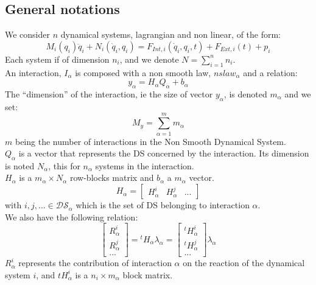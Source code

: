 \documentclass[10pt]{report}
\begin{document}
\subsection{General notations}
We consider $n$ dynamical systems, lagrangian and non linear, of the form: 
\begin{equation}
M_i(q_i) \ddot q_i + N_i(\dot q_i, q_i) = F_{Int,i}(\dot q_i , q_i , t)+F_{Ext,i}(t) + p_i
\end{equation}
Each system if of dimension $n_i$, and we denote $N = \displaystyle{\sum_{i=1}^{n} n_i}$. \\
An interaction, $I_{\alpha}$ is composed with a non smooth law, $nslaw_{\alpha}$ and a relation:
\begin{equation}
y_{\alpha} = H_{\alpha}Q_{\alpha} + b_{\alpha}
\end{equation}
The ``dimension'' of the interaction, ie the size of vector $y_{\alpha}$, is denoted $m_{\alpha}$ and we set: 
$$ M_y = \sum_{\alpha=1}^{m} m_{\alpha}$$
$m$ being the number of interactions in the Non Smooth Dynamical System.  \\
$Q_{\alpha}$ is a vector that represents the DS concerned by the interaction. Its dimension is noted $N_{\alpha}$, this for $n_{\alpha}$ systems in the interaction. \\
$H_{\alpha}$ is a $m_{\alpha} \times N_{\alpha}$ row-blocks matrix and $b_{\alpha}$ a $m_{\alpha}$ vector. \\
\begin{equation}
H_{\alpha}=\left[\begin{array}{ccc} 
H_{\alpha}^i & H_{\alpha}^j & ...\end{array}\right]
\end{equation}
with $i,j,...\in \mathcal{DS}_{\alpha}$ which is the set of DS belonging to interaction $\alpha$.\\
We also have the following relation: 
\begin{equation}
\left[\begin{array}{c} 
R_{\alpha}^i \\
R_{\alpha}^j \\
...  
\end{array}\right] = {}^tH_{\alpha}\lambda_{\alpha}
=\left[\begin{array}{c} 
{}^tH_{\alpha}^i \\
{}^tH_{\alpha}^j \\
...
\end{array}\right]\lambda_{\alpha}
\end{equation}
$R_{\alpha}^i$ represents the contribution of interaction $\alpha$ on the reaction of the dynamical system $i$, and ${}tH_{\alpha}^i$ is a $n_i \times m_{\alpha}$ block matrix. \\ 
\end{document}
